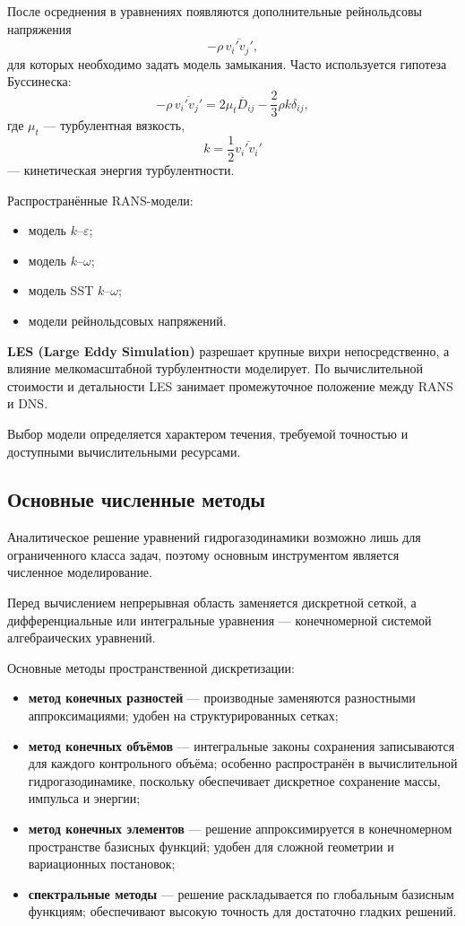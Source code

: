 После осреднения в уравнениях появляются дополнительные рейнольдсовы напряжения
\[
-\rho\,\overline{v_i'v_j'},
\]
для которых необходимо задать модель замыкания. Часто используется гипотеза Буссинеска:
\[
-\rho\,\overline{v_i'v_j'}
=
2\mu_t \overline{D}_{ij}
-
\frac{2}{3}\rho k\delta_{ij},
\]
где $\mu_t$ --- турбулентная вязкость,
\[
k=\frac12\overline{v_i'v_i'}
\]
--- кинетическая энергия турбулентности.

Распространённые RANS-модели:
\begin{itemize}
	\item модель $k$--$\varepsilon$;
	\item модель $k$--$\omega$;
	\item модель SST $k$--$\omega$;
	\item модели рейнольдсовых напряжений.
\end{itemize}

\textbf{LES (Large Eddy Simulation)} разрешает крупные вихри непосредственно, а влияние мелкомасштабной турбулентности моделирует. По вычислительной стоимости и детальности LES занимает промежуточное положение между RANS и DNS.

Выбор модели определяется характером течения, требуемой точностью и доступными вычислительными ресурсами.

\subsection{Основные численные методы}

Аналитическое решение уравнений гидрогазодинамики возможно лишь для ограниченного класса задач, поэтому основным инструментом является численное моделирование.

Перед вычислением непрерывная область заменяется дискретной сеткой, а дифференциальные или интегральные уравнения --- конечномерной системой алгебраических уравнений.

Основные методы пространственной дискретизации:

\begin{itemize}
	\item \textbf{метод конечных разностей} --- производные заменяются разностными аппроксимациями; удобен на структурированных сетках;
	
	\item \textbf{метод конечных объёмов} --- интегральные законы сохранения записываются для каждого контрольного объёма; особенно распространён в вычислительной гидрогазодинамике, поскольку обеспечивает дискретное сохранение массы, импульса и энергии;
	
	\item \textbf{метод конечных элементов} --- решение аппроксимируется в конечномерном пространстве базисных функций; удобен для сложной геометрии и вариационных постановок;
	
	\item \textbf{спектральные методы} --- решение раскладывается по глобальным базисным функциям; обеспечивают высокую точность для достаточно гладких решений.
\end{itemize}

